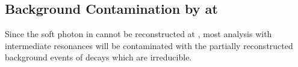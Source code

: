 %
%

\subsection{Background Contamination by \texorpdfstring{\decay{\Sz}{\Lz\Pgamma}}{Σ → Λγ} at \lhcb}
Since the soft photon in \decay{\Sz}{\Lz\Pgamma} cannot be reconstructed at \lhcb, most analysis with intermediate \Lz resonances will be contaminated with the partially reconstructed background events of \Sz decays which are irreducible.

